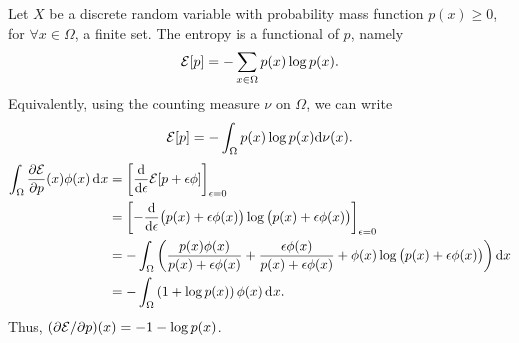 \begin{example}
  Let $X$ be a discrete random variable with probability mass function $p(x) \geq 0$, for $\forall x \in \Omega$, a finite set.
  The entropy is a functional of $p$, namely
  \[
    {\mathcal E}[p] = - \sum_{x\in\Omega} p(x)\log p(x).
  \]
  Equivalently, using the counting measure $\nu$ on $\Omega$, we can write
  \[
    {\mathcal E}[p] = -\int_\Omega p(x) \log p(x) \text{d}\nu(x).
  \]
  \begin{align*}
    \int_\Omega \frac{\partial{\mathcal E}}{\partial p}(x)\phi(x) \operatorname{d}\hspace{0.5pt}\! x
    &= \left[ \frac{\text{d}}{\text{d} \epsilon} {\mathcal E}[p +  \epsilon\phi] \right]_{\epsilon=0} \\
    &= \left[ -\frac{\text{d}}{\text{d} \epsilon} 
    \big( p(x) + \epsilon\phi(x) \big) 
    \log \big(p(x) + \epsilon\phi(x) \big) 
    \right]_{\epsilon=0} \\
    &= -\int_\Omega \left( 
    \frac{p(x)\phi(x)}{p(x)+\epsilon\phi(x)}
    + \frac{\epsilon\phi(x)}{p(x) + \epsilon\phi(x)}
    + \phi(x)\log\big( p(x) + \epsilon\phi(x) \big)
    \right) \text{d} x \\
    &= -\int_\Omega \left( 1 + \log p(x) \right) \phi(x) \operatorname{d}\hspace{0.5pt}\! x.
  \end{align*}
  Thus, $(\partial{\mathcal E}/\partial p)(x) = -1 -\log p(x)$.
\end{example}




